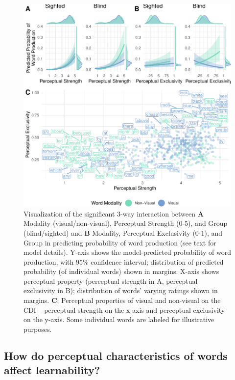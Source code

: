 \documentclass[english,man,floatsintext]{apa6}
\begin{document}
\begin{figure}
\centering
\includegraphics{VI_CDI_manuscript_files/figure-latex/visualornot-1.pdf}
\caption{\label{fig:visualornot}Visualization of the significant 3-way interaction between \textbf{A} Modality (visual/non-visual), Perceptual Strength (0-5), and Group (blind/sighted) and \textbf{B} Modality, Perceptual Exclusivity (0-1), and Group in predicting probability of word production (see text for model details). Y-axis shows the model-predicted probability of word production, with 95\% confidence interval; distribution of predicted probability (of individual words) shown in margins. X-axis shows perceptual property (perceptual strength in A, perceptual exclusivity in B); distribution of words' varying ratings shown in margins. \textbf{C}: Perceptual properties of visual and non-visual on the CDI -- perceptual strength on the x-axis and perceptual exclusivity on the y-axis. Some individual words are labeled for illustrative purposes.}
\end{figure}

\hypertarget{how-do-perceptual-characteristics-of-words-affect-learnability}{%
\subsection{How do perceptual characteristics of words affect learnability?}\label{how-do-perceptual-characteristics-of-words-affect-learnability}}
\end{document}
